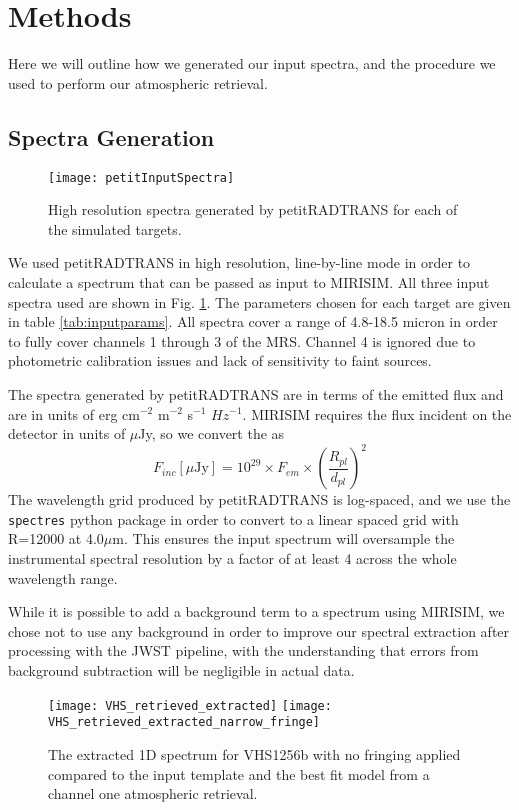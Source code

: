 \section{Methods}
Here we will outline how we generated our input spectra, and the procedure we used to perform our atmospheric retrieval.
\subsection{Spectra Generation}
\begin{figure}[t]
	\texttt{[image: petitInputSpectra]}
	\caption{High resolution spectra generated by petitRADTRANS for each of the simulated targets.}
	\label{fig:petitinput}
\end{figure}
We used petitRADTRANS in high resolution, line-by-line mode in order to calculate a spectrum that can be passed as input to MIRISIM.
All three input spectra used are shown in Fig. \ref{fig:petitinput}.
The parameters chosen for each target are given in table \ref{tab:inputparams}. 
All spectra cover a range of 4.8-18.5 micron in order to fully cover channels 1 through 3 of the MRS. 
Channel 4 is ignored due to photometric calibration issues and lack of sensitivity to faint sources.

The spectra generated by petitRADTRANS are in terms of the emitted flux and are in units of erg cm$^{-2}$ m$^{-2}$ s$^{-1}$ $Hz^{-1}$. 
MIRISIM requires the flux incident on the detector in units of $\mu$Jy, so we convert the as 
\begin{equation}
F_{inc} [\mu\textrm{Jy}] = 10^{29}\times F_{em} \times \left(\frac{R_{pl}}{d_{pl}}\right)^{2}
\end{equation}
The wavelength grid produced by petitRADTRANS is log-spaced, and we use the \verb|spectres| python package \parencite{Carnall2017} in order to convert to a linear spaced grid with R=12000 at 4.0$\mu$m. 
This ensures the input spectrum will oversample the instrumental spectral resolution by a factor of at least 4 across the whole wavelength range.

While it is possible to add a background term to a spectrum using MIRISIM, we chose not to use any background in order to improve our spectral extraction after processing with the JWST pipeline, with the understanding that errors from background subtraction will be negligible in actual data.
\begin{figure}[t]
	\texttt{[image: VHS\_retrieved\_extracted]}
	\texttt{[image: VHS\_retrieved\_extracted\_narrow\_fringe]}
	\caption{The extracted 1D spectrum for VHS1256b with no fringing applied compared to the input template and the best fit model from a channel one atmospheric retrieval.}
	\label{fig:vhsnofringeextractedbestfit}
\end{figure}
